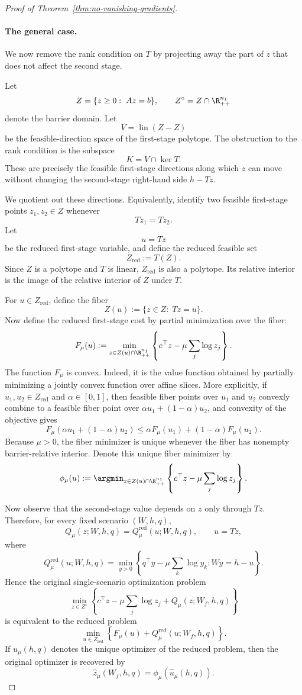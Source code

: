 \begin{proof}[Proof of Theorem~\ref{thm:no-vanishing-gradients}]
\paragraph{The general case.}
We now remove the rank condition on $T$ by projecting away the part of $z$ that does not affect the second stage.

Let
\[
Z=\{z\geq 0:\;Az=b\},
\qquad
Z^\circ=Z\cap\R^{n_1}_{++}
\]
denote the barrier domain. Let
\[
V=\operatorname{lin}(Z-Z)
\]
be the feasible-direction space of the first-stage polytope. The obstruction to the rank condition is the subspace
\[
K=V\cap\ker T.
\]
These are precisely the feasible first-stage directions along which $z$ can move without changing the second-stage right-hand side $h-Tz$.

We quotient out these directions. Equivalently, identify two feasible first-stage points $z_1,z_2\in Z$ whenever
\[
Tz_1=Tz_2.
\]
Let
\[
u=Tz
\]
be the reduced first-stage variable, and define the reduced feasible set
\[
Z_{\mathrm{red}}:=T(Z).
\]
Since $Z$ is a polytope and $T$ is linear, $Z_{\mathrm{red}}$ is also a polytope. Its relative interior is the image of the relative interior of $Z$ under $T$.

For $u\in Z_{\mathrm{red}}$, define the fiber
\[
Z(u):=\{z\in Z:\;Tz=u\}.
\]
Now define the reduced first-stage cost by partial minimization over the fiber:
\[
F_\mu(u)
:=
\min_{z\in Z(u)\cap\R^{n_1}_{++}}
\left\{
c^\top z-\mu\sum_j\log z_j
\right\}.
\]
The function $F_\mu$ is convex. Indeed, it is the value function obtained by partially minimizing a jointly convex function over affine slices. More explicitly, if $u_1,u_2\in Z_{\mathrm{red}}$ and $\alpha\in[0,1]$, then feasible fiber points over $u_1$ and $u_2$ convexly combine to a feasible fiber point over $\alpha u_1+(1-\alpha)u_2$, and convexity of the objective gives
\[
F_\mu(\alpha u_1+(1-\alpha)u_2)
\leq
\alpha F_\mu(u_1)+(1-\alpha)F_\mu(u_2).
\]
Because $\mu>0$, the fiber minimizer is unique whenever the fiber has nonempty barrier-relative interior. Denote this unique fiber minimizer by
\[
\phi_\mu(u)
:=
\argmin_{z\in Z(u)\cap\R^{n_1}_{++}}
\left\{
c^\top z-\mu\sum_j\log z_j
\right\}.
\]

Now observe that the second-stage value depends on $z$ only through $Tz$. Therefore, for every fixed scenario $(W,h,q)$,
\[
Q_\mu(z;W,h,q)=Q_\mu^{\mathrm{red}}(u;W,h,q),
\qquad
u=Tz,
\]
where
\[
Q_\mu^{\mathrm{red}}(u;W,h,q)
=
\min_{y>0}
\left\{
q^\top y-\mu\sum_k\log y_k:
Wy=h-u
\right\}.
\]
Hence the original single-scenario optimization problem
\[
\min_{z\in Z^\circ}
\left\{
c^\top z-\mu\sum_j\log z_j+Q_\mu(z;W_f,h,q)
\right\}
\]
is equivalent to the reduced problem
\[
\min_{u\in Z_{\mathrm{red}}}
\left\{
F_\mu(u)+Q_\mu^{\mathrm{red}}(u;W_f,h,q)
\right\}.
\]
If $\hat u_\mu(h,q)$ denotes the unique optimizer of the reduced problem, then the original optimizer is recovered by
\[
\hat z_\mu(W_f,h,q)=\phi_\mu(\hat u_\mu(h,q)).
\]


\end{proof}
